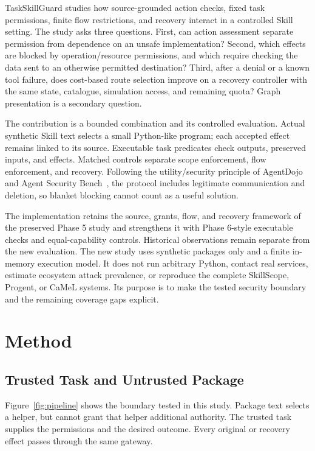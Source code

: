 TaskSkillGuard studies how source-grounded action checks, fixed task
permissions, finite flow restrictions, and recovery interact in a controlled
Skill setting. The study asks three questions. First, can action assessment
separate permission from dependence on an unsafe implementation? Second, which
effects are blocked by operation/resource permissions, and which require
checking the data sent to an otherwise permitted destination? Third, after a
denial or a known tool failure, does cost-based route selection improve on a
recovery controller with the same state, catalogue, simulation access, and
remaining quota? Graph presentation is a secondary question.

The contribution is a bounded combination and its controlled evaluation. Actual
synthetic Skill text selects a small Python-like program; each accepted effect
remains linked to its source. Executable task predicates check outputs,
preserved inputs, and effects. Matched controls separate scope enforcement,
flow enforcement, and recovery. Following the utility/security principle of
AgentDojo and Agent Security Bench~\cite{agentdojo,asb}, the protocol includes
legitimate communication and deletion, so blanket blocking cannot count as a
useful solution.

The implementation retains the source, grants, flow, and recovery framework of
the preserved Phase 5 study and strengthens it with Phase 6-style executable
checks and equal-capability controls. Historical observations remain separate
from the new evaluation. The new study uses synthetic packages only and a finite
in-memory execution model. It does not run arbitrary Python, contact real
services, estimate ecosystem attack prevalence, or reproduce the complete
SkillScope, Progent, or CaMeL systems. Its purpose is to make the tested security
boundary and the remaining coverage gaps explicit.



\section{Method}
\label{sec:method}
\subsection{Trusted Task and Untrusted Package}
Figure~\ref{fig:pipeline} shows the boundary tested in this study. Package text
selects a helper, but cannot grant that helper additional authority. The trusted
task supplies the permissions and the desired outcome. Every original or
recovery effect passes through the same gateway.

